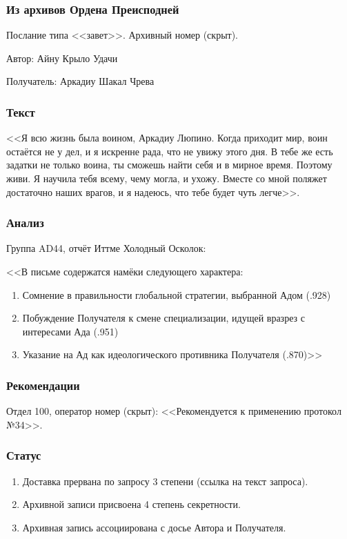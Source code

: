 \documentclass[a4paper,10pt]{book}
\begin{document}
\subsubsection{Из архивов Ордена Преисподней}

Послание типа <<завет>>. Архивный номер (скрыт).

Автор: Айну Крыло Удачи

Получатель: Аркадиу Шакал Чрева

\subsubsection{Текст}

<<Я всю жизнь была воином, Аркадиу Люпино. Когда приходит мир, воин остаётся не 
у дел, и я искренне рада, что не увижу этого дня. В тебе же есть задатки не 
только воина, ты сможешь найти себя и в мирное время. Поэтому живи. Я научила 
тебя всему, чему могла, и ухожу. Вместе со мной поляжет достаточно наших 
врагов, и я надеюсь, что тебе будет чуть легче>>.

\subsubsection{Анализ}

Группа AD44, отчёт Иттме Холодный Осколок:

<<В письме содержатся намёки следующего характера:

\begin{enumerate}
\item Сомнение в правильности глобальной стратегии, выбранной Адом (.928)
\item Побуждение Получателя к смене специализации, идущей вразрез с интересами 
Ада (.951)
\item Указание на Ад как идеологического противника Получателя (.870)>>
\end{enumerate}

\subsubsection{Рекомендации}

Отдел 100, оператор номер (скрыт): <<Рекомендуется к применению протокол №34>>.

\subsubsection{Статус}

\begin{enumerate}
\item Доставка прервана по запросу 3 степени (ссылка на текст запроса).
\item Архивной записи присвоена 4 степень секретности.
\item Архивная запись ассоциирована с досье Автора и Получателя.
\end{enumerate}
\end{document}

